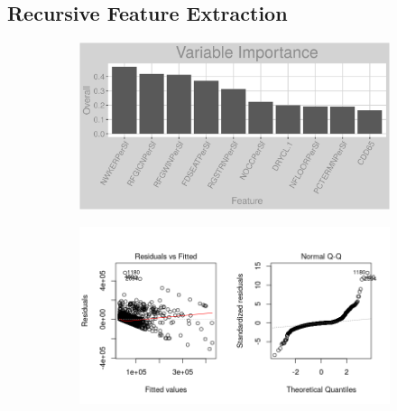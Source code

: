 \subsection{Recursive Feature Extraction}
\label{appendix:natural_gas:rfe}
\begin{figure}[h]
\centering
\begin{subfigure}{1\textwidth}
\centering
\includegraphics[width=.99\textwidth, height=0.3\textheight]{Images/natural_gas_psf_rfe_vars.png}
\end{subfigure}
\begin{subfigure}{1\textwidth}
\centering
\includegraphics[width=.99\textwidth, height=0.475\textheight]{Images/natural_gas_psf_rfe_res_1.png}
\end{subfigure}
\end{figure}
\FloatBarrier
\newpage
